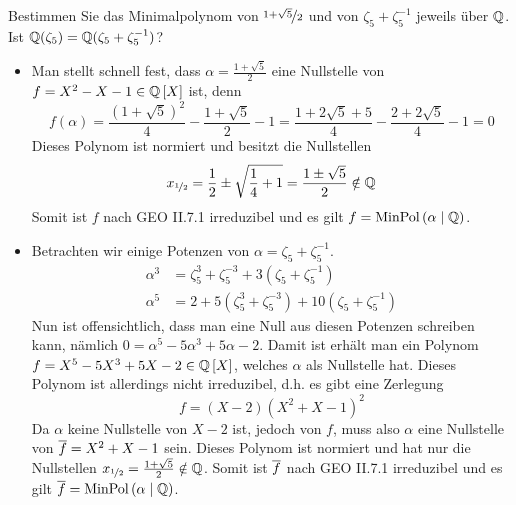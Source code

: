 \begin{exercisePage}
    \begin{homework}
        Bestimmen Sie das Minimalpolynom von $\lfrac{1+\sqrt{5}}{2}$ und von $\zeta_5 + \zeta_5^{-1}$ jeweils über $\mathbb{Q}$. Ist $\mathbb{Q}(\zeta_5) = \mathbb{Q}(\zeta_5 + \zeta_5^{-1})$?
    \end{homework}
    \begin{itemize}[leftmargin=*]
        \item Man stellt schnell fest, dass $\alpha = \frac{1 + \sqrt{5}}{2}$ eine Nullstelle von $f = X^2 - X -1 \in \polynom[\Q]$ ist, denn
        \begin{equation*}
            f(\alpha) = \frac{(1 + \sqrt{5})^2}{4} - \frac{1+\sqrt{5}}{2} - 1 
            = \frac{1 + 2\sqrt{5} + 5}{4} - \frac{2 + 2\sqrt{5}}{4} - 1 = 0
        \end{equation*}
        Dieses Polynom ist normiert und besitzt die Nullstellen 
        \begin{equation*}
            x_{\lfrac{1}{2}} = \frac{1}{2} \pm \sqrt{\frac{1}{4} + 1} = \frac{1 \pm \sqrt{5}}{2} \notin \Q
        \end{equation*}
        Somit ist $f$ nach GEO II.7.1 irreduzibel und es gilt $f = \operatorname{MinPol}\left( \alpha \mathrel{|} \mathbb{Q}\right)$.
        \item Betrachten wir einige Potenzen von $\alpha = \zeta_5 + \zeta_5^{-1}$.
        \begin{equation*}
            \begin{aligned}
            \alpha^3 &= \zeta_5^3 + \zeta_5^{-3} + 3(\zeta_5 + \zeta_5^{-1}) \\
            \alpha^5 &= 2 + 5(\zeta_5^3 + \zeta_5^{-3}) + 10(\zeta_5+\zeta_5^{-1})
            \end{aligned}
        \end{equation*}
        Nun ist offensichtlich, dass man eine Null aus diesen Potenzen schreiben kann, nämlich $0 = \alpha^5 - 5\alpha^3 + 5\alpha - 2$. Damit ist erhält man ein Polynom $f = X^5 - 5X^3 + 5X - 2 \in \polynom[\Q]$, welches $\alpha$ als Nullstelle hat. Dieses Polynom ist allerdings nicht irreduzibel, d.h. es gibt eine Zerlegung
        \begin{equation*}
            f = (X - 2)(X^2 + X - 1)^2
        \end{equation*}
        Da $\alpha$ keine Nullstelle von $X-2$ ist, jedoch von $f$, muss also $\alpha$ eine Nullstelle von $\overline{f} = X^2 + X -1$ sein. Dieses Polynom ist normiert und hat nur die Nullstellen $x_{\lfrac{1}{2}} = \frac{1 + \sqrt{5}}{2} \notin \Q$. Somit ist $\overline{f}$ nach GEO II.7.1 irreduzibel und es gilt $\overline{f} = \operatorname{MinPol}\left( \alpha \mathrel{|} \mathbb{Q}\right)$.

\end{itemize}
\end{exercisePage}
